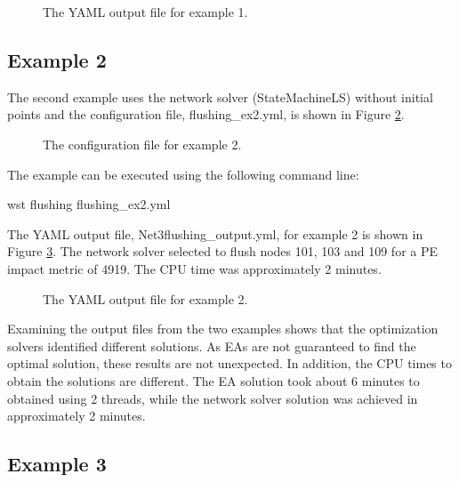 \begin{figure}[h]
  \caption{The  YAML output file for example 1.}
  \label{fig:flushing_ex1_yml}
\end{figure}

\subsection{Example 2}

The second example uses the network solver (StateMachineLS) 
without initial points and the configuration file, flushing\_ex2.yml, 
is shown in Figure \ref{fig:flushing_ex2}. 

\begin{figure}[h]
  \caption{The  configuration file for example 2.}
  \label{fig:flushing_ex2}
\end{figure}

The example can be executed using the following command line:

\begin{unknownListing}
wst flushing flushing_ex2.yml
\end{unknownListing}

The YAML output file, Net3flushing\_output.yml, for example 2 is shown 
in Figure \ref{fig:flushing_ex2_yml}. The network solver selected to 
flush nodes 101, 103 and 109 for a PE impact metric of 4919. The CPU time 
was approximately 2 minutes.

\begin{figure}[h]
  \caption{The  YAML output file for example 2.}
  \label{fig:flushing_ex2_yml}
\end{figure}

Examining the output files from the two examples shows that the optimization
solvers identified different solutions. As EAs are not guaranteed to find the 
optimal solution, these results are not unexpected. In addition, the CPU times 
to obtain the solutions are different. The EA solution took about 6 minutes 
to obtained using 2 threads, while the network solver solution was achieved in approximately 2 minutes.

\subsection{Example 3}\label{flushing_ex3}

